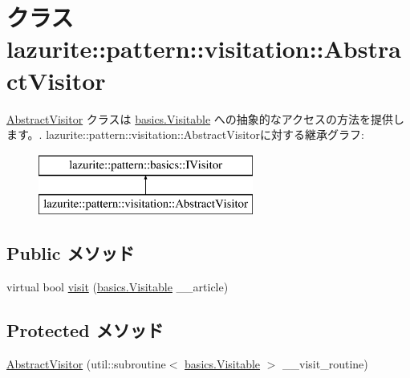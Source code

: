 \hypertarget{classlazurite_1_1pattern_1_1visitation_1_1_abstract_visitor}{
\section{クラス lazurite::pattern::visitation::AbstractVisitor}
\label{classlazurite_1_1pattern_1_1visitation_1_1_abstract_visitor}
}


\hyperlink{classlazurite_1_1pattern_1_1visitation_1_1_abstract_visitor}{AbstractVisitor} クラスは \hyperlink{interfacelazurite_1_1pattern_1_1basics_1_1_visitable}{basics.Visitable} への抽象的なアクセスの方法を提供します。.  
lazurite::pattern::visitation::AbstractVisitorに対する継承グラフ:\begin{figure}[H]
\begin{center}
\leavevmode
\includegraphics[height=2cm]{classlazurite_1_1pattern_1_1visitation_1_1_abstract_visitor}
\end{center}
\end{figure}
\subsection*{Public メソッド}
\begin{DoxyCompactItemize}
\item 
virtual bool \hyperlink{classlazurite_1_1pattern_1_1visitation_1_1_abstract_visitor_ad7b16d1b570a2138249a711c38e7d15f}{visit} (\hyperlink{interfacelazurite_1_1pattern_1_1basics_1_1_visitable}{basics.Visitable} \_\-\_\-article)
\end{DoxyCompactItemize}
\subsection*{Protected メソッド}
\begin{DoxyCompactItemize}
\item 
\hyperlink{classlazurite_1_1pattern_1_1visitation_1_1_abstract_visitor_afaf79739e852e350b1860ca72323355f}{AbstractVisitor} (util::subroutine$<$ \hyperlink{interfacelazurite_1_1pattern_1_1basics_1_1_visitable}{basics.Visitable} $>$ \_\-\_\-visit\_\-routine)
\end{DoxyCompactItemize}


